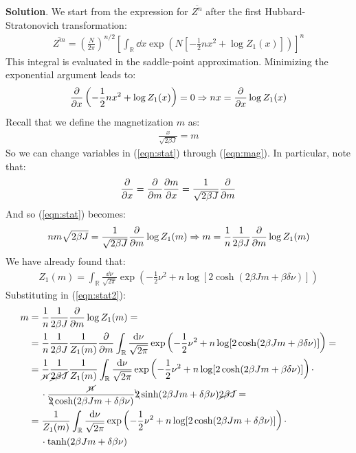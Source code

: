 \documentclass[../template.tex]{subfiles}
\begin{document}
\begin{exo}
    \textbf{Solution}. 
    We start from the expression for $\overline{Z^n}$ after the first Hubbard-Stratonovich transformation:
    \begin{align}\label{eqn:stat}
        \overline{Z^m} = \left(\frac{N}{2\pi} \right)^{n/2} \left[\int_{\mathbb{R}} \dd{x} \exp\left(N \left[-\frac{1}{2} n x^2 + \log Z_1(x) \right]\right)\right]^n
    \end{align}
    This integral is evaluated in the saddle-point approximation. Minimizing the exponential argument leads to:
    \begin{align}\label{eqn:mag}
        \pdv{x} \left(-\frac{1}{2} n x^2 + \log Z_1(x) \right) = 0 \Rightarrow n x = \pdv{x} \log Z_1(x)
    \end{align}
    Recall that we define the magnetization $m$ as:
    \begin{align*}
        \frac{x}{\sqrt{2 \beta J}} = m
    \end{align*}
    So we can change variables in (\ref{eqn:stat}) through (\ref{eqn:mag}). In particular, note that:
    \begin{align*}
        \pdv{x} = \pdv{m} \pdv{m}{x} = \frac{1}{\sqrt{2 \beta J}}  \pdv{m}
    \end{align*}
    And so (\ref{eqn:stat}) becomes:
    \begin{align} \label{eqn:stat2}
        n m \sqrt{2 \beta J} = \frac{1}{\sqrt{2 \beta J}}  \pdv{m} \log Z_1(m) \Rightarrow m = \frac{1}{n} \frac{1}{2 \beta J} \pdv{m} \log Z_1(m)  
    \end{align}
    We have already found that:
    \begin{align*}
        Z_1(m) = \int_{\mathbb{R}} \frac{\dd{\nu}}{\sqrt{2 \pi}}  \exp\left(-\frac{1}{2} \nu^2 + n\log[2 \cosh(2 \beta J m + \beta \delta \nu)] \right)
    \end{align*}
    Substituting in (\ref{eqn:stat2}):
    \begin{align*}
        m &= \frac{1}{n} \frac{1}{2 \beta J}   \pdv{m} \log Z_1(m) = \\
          &= \frac{1}{n} \frac{1}{2 \beta J} \frac{1}{Z_1(m)} \pdv{m} \int_{\mathbb{R}} \frac{\dd{\nu}}{\sqrt{2 \pi}}  \exp\left(-\frac{1}{2} \nu^2 + n\log[2 \cosh(2 \beta J m + \beta \delta \nu)] \right) =  \\
          &= \frac{1}{\cancel{n}} \frac{1}{\cancel{2 \beta J}} \frac{1}{Z_1(m)}  \int_{\mathbb{R}} \frac{\dd{\nu}}{\sqrt{2 \pi}}  \exp\left(-\frac{1}{2} \nu^2 + n\log[2 \cosh(2 \beta J m + \beta \delta \nu)] \right) \cdot \\
          &\quad \> \cdot \frac{\cancel{n}}{\bcancel{2} \cosh(2 \beta J m + \delta \beta \nu)} \bcancel{2} \sinh(2 \beta J m + \delta \beta \nu)\cancel{ 2 \beta J} =\\
         &= \frac{1}{Z_1(m)} \int_{\mathbb{R}} \frac{\dd{\nu}}{\sqrt{2 \pi}} \exp\left(-\frac{1}{2} \nu^2 + n \log [2 \cosh(2 \beta J m + \delta \beta \nu)] \right) \cdot\\
        &\quad \> \cdot \tanh(2 \beta J m + \delta \beta \nu )
    \end{align*}
\end{exo}
\end{document}
